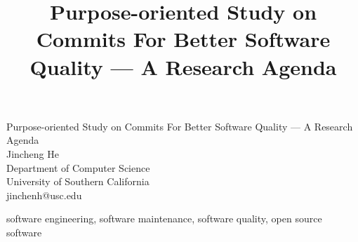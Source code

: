 \documentclass[10pt,conference]{IEEEtran}
\begin{document}
\begin{titlepage}


\title{Purpose-oriented Study on Commits For Better Software Quality --- A Research Agenda}

\author{
}

\vspace*{\fill}
\begin{center}
  {\Huge Purpose-oriented Study on Commits For Better Software Quality --- A Research Agenda}\\[5cm]
  {\Large Jincheng He}\\[0.5cm]
  {\Large Department of Computer Science}\\[0.5cm]
  {\Large University of Southern California}\\[0.5cm]
  {\Large jinchenh@usc.edu}\\[0.5cm]
  {\date{}}

\end{center}
\vspace*{\fill}
\end{titlepage}

\begin{abstract}

\end{abstract}

\begin{IEEEkeywords}
software engineering, software maintenance, software quality, open source software
\end{IEEEkeywords}












\medskip



\vspace{12pt}
\color{red}
\end{document}
